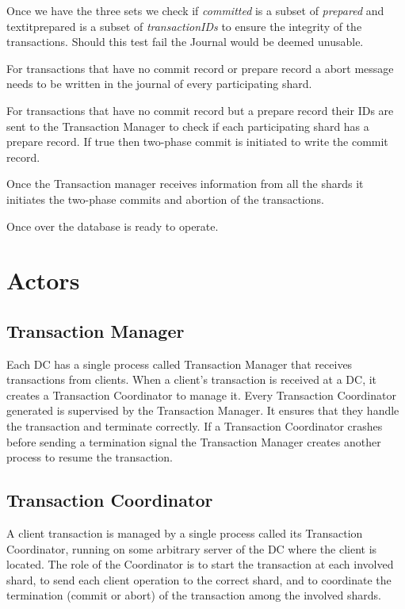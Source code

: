 \documentclass[twoside]{article}
\begin{document}
Once we have the three sets we check if \textit{committed} is a subset of \textit{prepared} and textit{prepared} is a subset of \textit{transactionIDs} to ensure the integrity of the transactions. 
Should this test fail the Journal would be deemed unusable.

For transactions that have no commit record or prepare record a abort message needs to be written in the journal of every participating shard. 

For transactions that have no commit record but a prepare record their IDs are sent to the Transaction Manager to check if each participating shard has a prepare record. If true then two-phase commit is initiated to write the commit record.

Once the Transaction manager receives information from all the shards it initiates the two-phase commits and abortion of the transactions.

Once over the database is ready to operate.



\section{Actors}
\subsection{Transaction Manager}
\label{sec:transaction-daemon}

Each DC has a single process called Transaction Manager that receives
transactions from clients.
When a client's transaction is received at a DC, it creates a Transaction
Coordinator to manage it.
Every Transaction Coordinator generated is supervised by the Transaction
Manager. 
It ensures that they handle the transaction and terminate correctly.
If a Transaction Coordinator crashes before sending a termination signal the
Transaction Manager creates another process to resume the transaction.


\subsection{Transaction Coordinator}
\label{sec:transaction-coordinator}
            
A client transaction is managed by a single process called its
Transaction Coordinator, running on some arbitrary server of the DC
where the client is located.
The role of the Coordinator is to start the transaction at each involved
shard, to send each client operation to the correct shard, and to
coordinate the termination (commit or abort) of the transaction among
the involved shards.
\end{document}
